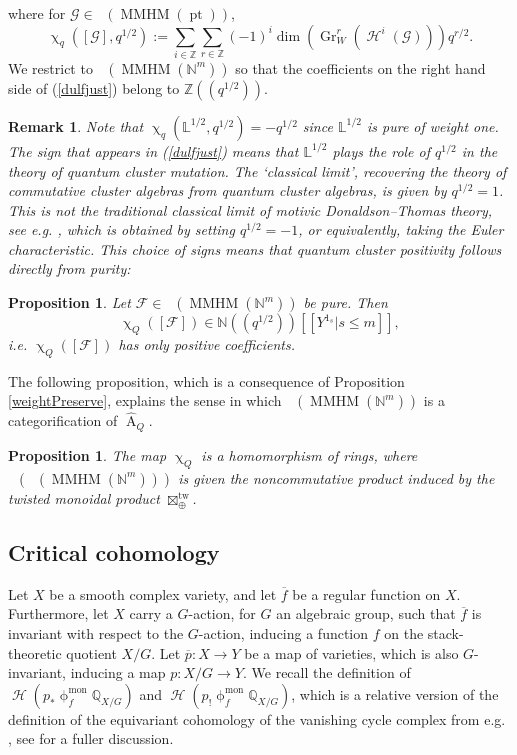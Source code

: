 \documentclass[a4paper,10pt]{amsart}
\newtheorem{proposition}[theorem]{Proposition}
\newtheorem{remark}[theorem]{Remark}
\newcommand{\LL}{\mathbb{L}}
\newcommand{\phim}[1]{\phi^{\mon}_{#1}}
\renewcommand{\chi}{\upchi}
\renewcommand{\phi}{\upphi}
\DeclareMathOperator{\KK}{K_0}
\DeclareMathOperator{\tw}{tw}
\DeclareMathOperator{\Ror}{A}
\DeclareMathOperator{\mon}{mon}
\DeclareMathOperator{\MMHM}{MMHM}
\DeclareMathOperator{\Gr}{Gr}
\DeclareMathOperator{\pt}{pt}
\DeclareMathOperator{\Ho}{\mathcal{H}}
\DeclareMathOperator{\Dulf}{\mathcal{D}^{\geq, lf}}
\begin{document}
where for $\mathcal{G}\in\Dulf(\MMHM(\pt))$,
\[
\chi_q([\mathcal{G}],q^{1/2}):=\sum_{i\in\mathbb{Z}}\sum_{r\in \mathbb{Z}}(-1)^i\dim\left(\Gr_W^{r}(\Ho^i(\mathcal{G}))\right)q^{r/2}.
\]
We restrict to $\Dulf(\MMHM(\mathbb{N}^m))$ so that the coefficients on the right hand side of (\ref{dulfjust}) belong to $\mathbb{Z}((q^{1/2}))$.  
\begin{remark}\label{Lsign}
Note that $\chi_q(\mathbb{L}^{1/2},q^{1/2})=-q^{1/2}$ since $\mathbb{L}^{1/2}$ is pure of weight one.  The sign that appears in (\ref{dulfjust}) means that $\LL^{1/2}$ plays the role of $q^{1/2}$ in the theory of quantum cluster mutation.  The `classical limit', recovering the theory of commutative cluster algebras from quantum cluster algebras, is given by $q^{1/2}=1$.  This is \textit{not} the traditional classical limit of motivic Donaldson--Thomas theory, see e.g. \cite[Sec.7.1]{KS}, which is obtained by setting $q^{1/2}=-1$, or equivalently, taking the Euler characteristic.  This choice of signs means that quantum cluster positivity follows directly from purity:
\end{remark}
\begin{proposition}
Let $\mathcal{F}\in\Dulf(\MMHM(\mathbb{N}^m))$ be pure.  Then 
\[
\chi_Q([\mathcal{F}])\in \mathbb{N}((q^{1/2}))[[Y^{1_s}|s\leq m]],
\]
i.e. $\chi_Q([\mathcal{F}])$ has only positive coefficients.
\end{proposition}

The following proposition, which is a consequence of Proposition \ref{weightPreserve}, explains the sense in which $\Dulf(\MMHM(\mathbb{N}^{m}))$ is a categorification of $\hat{\Ror}_Q$.

\begin{proposition}
The map $\chi_{Q}$ is a homomorphism of rings, where $\KK\left(\Dulf(\MMHM(\mathbb{N}^{m}))\right)$ is given the noncommutative product induced by the twisted monoidal product $\boxtimes_{\oplus}^{\tw}$.
\end{proposition}



\subsection{Critical cohomology}
Let $X$ be a smooth complex variety, and let $\overline{f}$ be a regular function on $X$.  Furthermore, let $X$ carry a $G$-action, for $G$ an algebraic group, such that $\overline{f}$ is invariant with respect to the $G$-action, inducing a function $f$ on the stack-theoretic quotient $X/G$.  Let $\overline{p}\colon X\rightarrow Y$ be a map of varieties, which is also $G$-invariant, inducing a map $p\colon X/G\rightarrow Y$.  We recall the definition of $\Ho(p_*\phim{f}\mathbb{Q}_{X/G})$ and $\Ho(p_!\phim{f}\mathbb{Q}_{X/G})$, which is a relative version of the definition of the equivariant cohomology of the vanishing cycle complex from e.g. \cite[Sec.7]{COHA}, see \cite[Sec.2.2]{DaMe15b} for a fuller discussion.  
\end{document}
